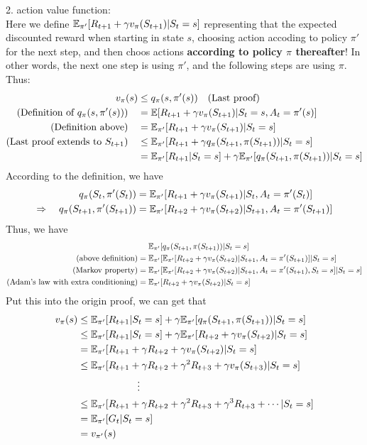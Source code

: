 \begin{homeworkProblem}
2. action value function: \\
Here we define $\mathbb{E}_{\pi'}[R_{t+1}+\gamma v_{\pi}(S_{t+1})|S_t=s]$ representing that the expected discounted reward when starting in state $s$, choosing action accoding to policy $\pi'$ for the next step, and then choos actions \textbf{according to policy $\pi$ thereafter}! In other words, the next one step is using $\pi'$, and the following steps are using $\pi$. Thus:
\begin{align*}
v_{\pi}(s) &\leq q_{\pi}(s,\pi'(s)) \quad\text{(Last proof)} \\
\text{(Definition of $q_{\pi}(s,\pi'(s))$)}\quad &= \mathbb{E}[R_{t+1}+\gamma v_{\pi}(S_{t+1})|S_t=s,A_t=\pi'(s)] \\
\text{(Definition above)}\quad &= \mathbb{E}_{\pi'}[R_{t+1}+\gamma v_{\pi}(S_{t+1})|S_t=s] \\
\text{(Last proof extends to $S_{t+1}$)}\quad &\leq \mathbb{E}_{\pi'}[R_{t+1}+\gamma q_{\pi}(S_{t+1},\pi(S_{t+1}))|S_t=s] \\
&= \mathbb{E}_{\pi'}[R_{t+1}|S_t=s] + \gamma \mathbb{E}_{\pi'}[q_{\pi}(S_{t+1},\pi(S_{t+1}))|S_t=s]
\end{align*}
According to the definition, we have
\begin{align*}
q_{\pi}(S_t,\pi'(S_t)) &= \mathbb{E}_{\pi'}[R_{t+1}+\gamma v_{\pi}(S_{t+1})|S_t,A_t=\pi'(S_t)] \\
\Rightarrow\quad q_{\pi}(S_{t+1},\pi'(S_{t+1})) &= \mathbb{E}_{\pi'}[R_{t+2}+\gamma v_{\pi}(S_{t+2})|S_{t+1},A_t=\pi'(S_{t+1})]
\end{align*}
Thus, we have
\begin{align*}
&\quad\ \mathbb{E}_{\pi'}[q_{\pi}(S_{t+1},\pi(S_{t+1}))|S_t=s] \\
\text{(above definition)} &= \mathbb{E}_{\pi'}[\mathbb{E}_{\pi'}[R_{t+2}+\gamma v_{\pi}(S_{t+2})|S_{t+1},A_t=\pi'(S_{t+1})]|S_t=s] \\
\text{(Markov property)} &= \mathbb{E}_{\pi'}[\mathbb{E}_{\pi'}[R_{t+2}+\gamma v_{\pi}(S_{t+2})|S_{t+1},A_t=\pi'(S_{t+1}),S_t=s]|S_t=s] \\
\text{(Adam's law with extra conditioning)} &= \mathbb{E}_{\pi'}[R_{t+2}+\gamma v_{\pi}(S_{t+2})|S_t=s] \\
\end{align*}
Put this into the origin proof, we can get that
\begin{align*}
v_{\pi}(s) &\leq \mathbb{E}_{\pi'}[R_{t+1}|S_t=s] + \gamma \mathbb{E}_{\pi'}[q_{\pi}(S_{t+1},\pi(S_{t+1}))|S_t=s] \\
&\leq \mathbb{E}_{\pi'}[R_{t+1}|S_t=s] + \gamma \mathbb{E}_{\pi'}[R_{t+2}+\gamma v_{\pi}(S_{t+2})|S_t=s] \\
&= \mathbb{E}_{\pi'}[R_{t+1} + \gamma R_{t+2}+\gamma v_{\pi}(S_{t+2})|S_t=s] \\
&\leq \mathbb{E}_{\pi'}[R_{t+1} + \gamma R_{t+2} + \gamma^2 R_{t+3} + \gamma v_{\pi}(S_{t+3})|S_t=s] \\
&\qquad\qquad\qquad\vdots \\
&\leq \mathbb{E}_{\pi'}[R_{t+1} + \gamma R_{t+2} + \gamma^2 R_{t+3} + \gamma^3R_{t+3} + \cdots|S_t=s] \\
&= \mathbb{E}_{\pi'}[G_t|S_t=s] \\
&= v_{\pi'}(s)
\end{align*}


\end{homeworkProblem}
